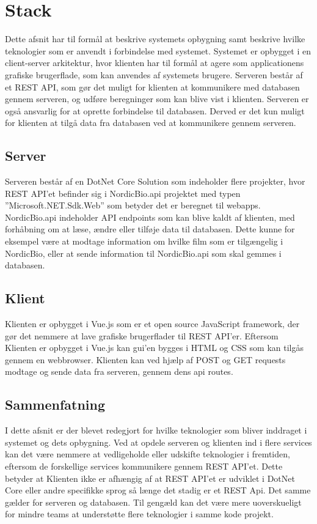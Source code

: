\section{Stack}
Dette afsnit har til formål at beskrive systemets opbygning samt beskrive hvilke teknologier som er anvendt i forbindelse med systemet. 
Systemet er opbygget i en client-server arkitektur, hvor klienten har til formål at agere som applicationens grafiske 
brugerflade, som kan anvendes af systemets brugere. Serveren består af et REST API, som gør det muligt for klienten 
at kommunikere med databasen gennem serveren, og udføre beregninger som kan blive vist i klienten. Serveren er også 
ansvarlig for at oprette forbindelse til databasen. Derved er det kun muligt for klienten at tilgå data fra databasen 
ved at kommunikere gennem serveren.\\

\subsection{Server}
Serveren består af en DotNet Core Solution som indeholder flere projekter, hvor REST API’et befinder sig i NordicBio.api 
projektet med typen ”Microsoft.NET.Sdk.Web” som betyder det er beregnet til webapps. 
NordicBio.api indeholder API endpoints som kan blive kaldt af klienten, med forhåbning om at læse, ændre eller tilføje data til databasen. 
Dette kunne for eksempel være at modtage information om hvilke film som er tilgængelig i NordicBio, eller at sende information til 
NordicBio.api som skal gemmes i databasen.\\

\subsection{Klient}
Klienten er opbygget i Vue.js som er et open source JavaScript framework, der gør det nemmere at lave grafiske 
brugerflader til REST API’er. Eftersom Klienten er opbygget i Vue.js kan gui’en bygges i HTML og CSS som kan tilgås 
gennem en webbrowser. Klienten kan ved hjælp af POST og GET requests modtage og sende data fra serveren, 
gennem dens api routes.\\

\subsection{Sammenfatning}
I dette afsnit er der blevet redegjort for hvilke teknologier som bliver inddraget i systemet og dets opbygning. 
Ved at opdele serveren og klienten ind i flere services kan det være nemmere at vedligeholde eller udskifte teknologier 
i fremtiden, eftersom de forskellige services kommunikere gennem REST API’et. 
Dette betyder at Klienten ikke er afhængig af at REST API’et er udviklet i DotNet Core eller andre specifikke sprog så 
længe det stadig er et REST Api. Det samme gælder for serveren og databasen. Til gengæld kan det være mere uoverskueligt 
for mindre teams at understøtte flere teknologier i samme kode projekt. 


